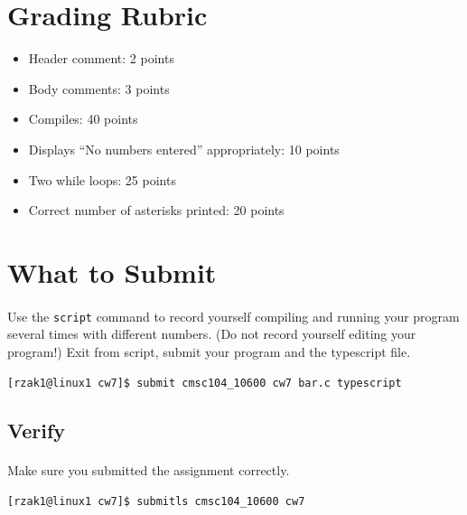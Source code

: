 \documentclass[letter,11pt]{article}
\begin{document}
\section*{Grading Rubric}
\begin{itemize}
    \item Header comment: 2 points
    \item Body comments: 3 points
    \item Compiles: 40 points
    \item Displays ``No numbers entered'' appropriately: 10 points
    \item Two while loops: 25 points
    \item Correct number of asterisks printed: 20 points
\end{itemize}

\section*{What to Submit}
\paragraph{}Use the \texttt{script} command to record yourself compiling and running your program several times with different numbers. (Do not record yourself editing your program!) Exit from script, submit your program and the typescript file.
\begin{verbatim}
[rzak1@linux1 cw7]$ submit cmsc104_10600 cw7 bar.c typescript
\end{verbatim}

\subsection*{Verify}
\paragraph{}Make sure you submitted the assignment correctly.
\begin{verbatim}
[rzak1@linux1 cw7]$ submitls cmsc104_10600 cw7
\end{verbatim}
\end{document}
